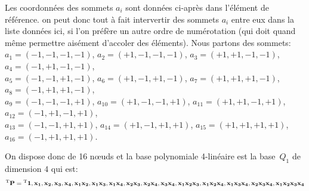 \medskip
Les coordonnées des sommets $a_i$ sont données ci-après dans l'élément de référence.  on peut donc tout à fait intervertir des sommets $a_i$ entre eux dans la liste données ici, si l'on préfère un autre ordre de numérotation (qui doit quand même permettre aisément d'accoler des éléments).
Nous partons des sommets:\\
$a_1=(-1,-1,-1,-1)$, $a_2=(+1,-1,-1,-1)$, $a_3=(+1,+1,-1,-1)$, $a_4=(-1,+1,-1,-1)$,\\
$a_5=(-1,-1,+1,-1)$, $a_6=(+1,-1,+1,-1)$, $a_7=(+1,+1,+1,-1)$, $a_8=(-1,+1,+1,-1)$,\\
$a_9=(-1,-1,-1,+1)$, $a_{10}=(+1,-1,-1,+1)$, $a_{11}=(+1,+1,-1,+1)$, $a_{12}=(-1,+1,-1,+1)$,\\
$a_{13}=(-1,-1,+1,+1)$, $a_{14}=(+1,-1,+1,+1)$, $a_{15}=(+1,+1,+1,+1)$, $a_{16}=(-1,+1,+1,+1)$.

\medskip
On dispose donc de 16 nœuds et la base polynomiale 4-linéaire est la base~$Q_1$ de dimension $4$ qui est:
\[
{}^\mathrm{T}\mathbf{P} = {}^\mathrm{T}\mathbf{1, x_1, x_2, x_3, x_4, 
             x_1x_2, x_1x_3, x_1x_4, x_2x_3, x_2x_4, x_3x_4,
             x_1x_2x_3, x_1x_2x_4, x_1x_3x_4, x_2x_3x_4,
             x_1x_2x_3x_4}
\]

